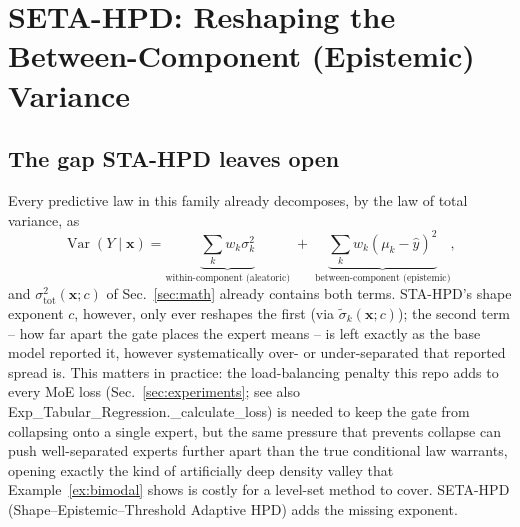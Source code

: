 \documentclass[10pt,twocolumn,a4paper]{article}
\begin{document}
\section{SETA-HPD: Reshaping the Between-Component (Epistemic) Variance}
\label{sec:seta}

\subsection{The gap STA-HPD leaves open}
Every predictive law in this family already decomposes, by the law of total variance, as
\begin{equation}
\operatorname{Var}(Y\mid\bm x) = \underbrace{\textstyle\sum_k w_k\sigma_k^2}_{\text{within-component (aleatoric)}}
\;+\; \underbrace{\textstyle\sum_k w_k(\mu_k-\hat y)^2}_{\text{between-component (epistemic)}},
\label{eq:lotv}
\end{equation}
and $\sigma_{\mathrm{tot}}^2(\bm x;c)$ of Sec.~\ref{sec:math} already contains both terms. STA-HPD's
shape exponent $c$, however, only ever reshapes the first (via $\tilde\sigma_k(\bm x;c)$); the second
term -- how far apart the gate places the expert means -- is left exactly as the base model reported
it, however systematically over- or under-separated that reported spread is. This matters in
practice: the load-balancing penalty this repo adds to every MoE loss (Sec.~\ref{sec:experiments};
see also Exp\_Tabular\_Regression.\_calculate\_loss) is needed to keep the gate from collapsing onto
a single expert, but the same pressure that prevents collapse can push well-separated experts further
apart than the true conditional law warrants, opening exactly the kind of artificially deep density
valley that Example~\ref{ex:bimodal} shows is costly for a level-set method to cover. SETA-HPD
(Shape--Epistemic--Threshold Adaptive HPD) adds the missing exponent.
\end{document}
